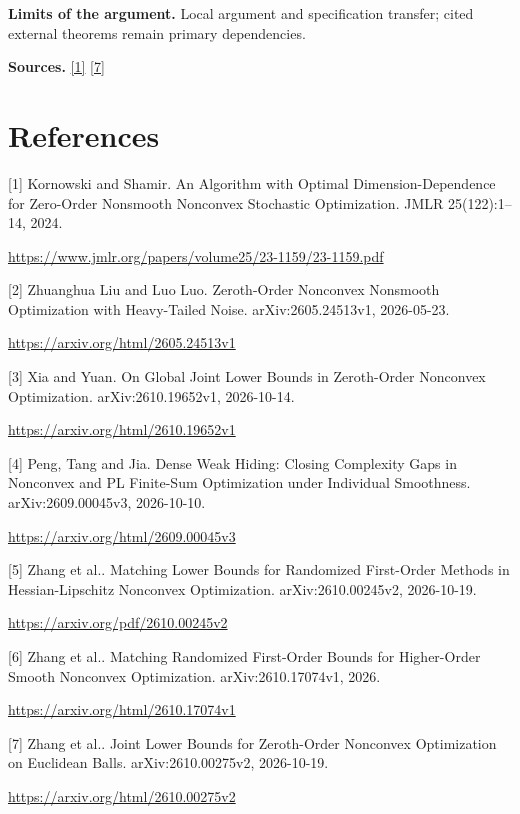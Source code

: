 \documentclass[10pt,a4paper]{article}
\begin{document}
\textbf{Limits of the argument.} Local argument and specification transfer; cited external theorems remain primary dependencies.

\textbf{Sources.} \href{https://www.jmlr.org/papers/volume25/23-1159/23-1159.pdf}{[1]} \href{https://arxiv.org/html/2610.00275v2}{[7]}

\section{References}
[1] Kornowski and Shamir. An Algorithm with Optimal Dimension-Dependence for Zero-Order Nonsmooth Nonconvex Stochastic Optimization. JMLR 25(122):1--14, 2024.

\url{https://www.jmlr.org/papers/volume25/23-1159/23-1159.pdf}

[2] Zhuanghua Liu and Luo Luo. Zeroth-Order Nonconvex Nonsmooth Optimization with Heavy-Tailed Noise. arXiv:2605.24513v1, 2026-05-23.

\url{https://arxiv.org/html/2605.24513v1}

[3] Xia and Yuan. On Global Joint Lower Bounds in Zeroth-Order Nonconvex Optimization. arXiv:2610.19652v1, 2026-10-14.

\url{https://arxiv.org/html/2610.19652v1}

[4] Peng, Tang and Jia. Dense Weak Hiding: Closing Complexity Gaps in Nonconvex and PL Finite-Sum Optimization under Individual Smoothness. arXiv:2609.00045v3, 2026-10-10.

\url{https://arxiv.org/html/2609.00045v3}

[5] Zhang et al.. Matching Lower Bounds for Randomized First-Order Methods in Hessian-Lipschitz Nonconvex Optimization. arXiv:2610.00245v2, 2026-10-19.

\url{https://arxiv.org/pdf/2610.00245v2}

[6] Zhang et al.. Matching Randomized First-Order Bounds for Higher-Order Smooth Nonconvex Optimization. arXiv:2610.17074v1, 2026.

\url{https://arxiv.org/html/2610.17074v1}

[7] Zhang et al.. Joint Lower Bounds for Zeroth-Order Nonconvex Optimization on Euclidean Balls. arXiv:2610.00275v2, 2026-10-19.

\url{https://arxiv.org/html/2610.00275v2}
\end{document}
